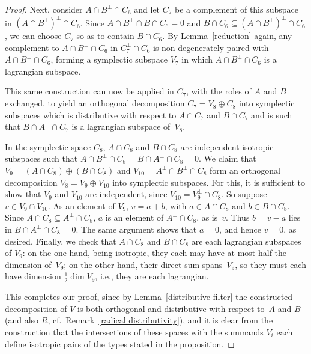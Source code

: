\documentclass[pdftex]{sigma}
\numberwithin{equation}{section}
\begin{document}
\begin{proof}
Next, consider $A \cap B^{\perp} \cap C_6$ and let $C_7$ be a complement of this subspace in $(A \cap B^{\perp})^{\perp} \cap C_6$. Since $A \cap B^{\perp} \cap B \cap C_6 = 0$ and $B \cap C_6 \subseteq (A \cap B^{\perp})^{\perp} \cap C_6$, we can choose $C_7$ so as to contain $B \cap C_6$.  By Lemma~\ref{reduction} again, any complement to $A \cap B^{\perp} \cap C_6$ in $C_7^{\perp} \cap C_6$ is non-degenerately paired with $A \cap B^{\perp} \cap C_6$, forming a symplectic subspace $V_7$ in which $A \cap B^{\perp} \cap C_6$ is a lagrangian subspace.

This same construction can now be applied in $C_7$, with the roles of $A$ and $B$ exchanged, to yield an orthogonal decomposition $C_7 = V_8 \oplus C_8$ into symplectic subspaces which is distributive with respect to $A \cap C_7$ and $B \cap C_7$ and is such that $B \cap A^{\perp} \cap C_7$ is a lagrangian subspace of~$V_8$.

In the symplectic space $C_8$, $A \cap C_8$ and $B \cap C_8$ are independent isotropic subspaces such that $A \cap B^{\perp} \cap C_8 = B \cap A^{\perp} \cap C_8 = 0$. We claim that $V_9 = (A \cap C_8) \oplus (B \cap C_8)$ and $V_{10} = A^{\perp} \cap B^{\perp} \cap C_8$ form an orthogonal decomposition $V_8 = V_9 \oplus V_{10}$ into symplectic subspaces. For this, it is suf\/f\/icient to show that $V_9$ and $V_{10}$ are independent, since $V_{10} = V_9^{\perp} \cap C_8$. So suppose $v \in V_9 \cap V_{10}$. As an element of $V_9$, $v = a + b$, with $a \in A \cap C_8$ and $ b \in B \cap C_8$. Since $A \cap C_8 \subseteq A^{\perp} \cap C_8$, $a$ is an element of $A^{\perp} \cap C_8$, as is~$v$. Thus $b = v - a$ lies in $B \cap A^{\perp} \cap C_8 = 0$. The same argument shows that $a =0$, and hence $v = 0$, as desired. Finally, we check that $A \cap C_8$ and $B \cap C_8$ are each lagrangian subspaces of $V_9$: on the one hand, being isotropic, they each may have at most half the dimension of~$V_9$; on the other hand, their direct sum spans~$V_9$, so they must each have dimension $\tfrac{1}{2}\dim V_9$,  i.e., they are each lagrangian.

This completes our proof, since by Lemma~\ref{distributive filter} the constructed decomposition of $V$ is both orthogonal and distributive with respect to~$A$ and $B$ (and also $R$,  cf.\ Remark~\ref{radical distributivity}), and it is clear from the construction that the intersections of these spaces with the summands $V_i$ each def\/ine isotropic pairs of the types stated in the proposition.
\end{proof}
\end{document}
